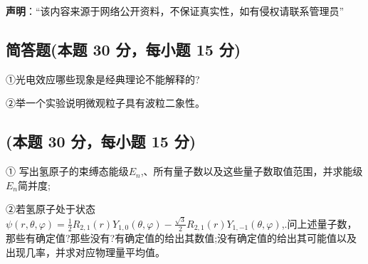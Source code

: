 
\textbf{声明}：“该内容来源于网络公开资料，不保证真实性，如有侵权请联系管理员”

\subsection{简答题(本题 30 分，每小题 15 分)}
①光电效应哪些现象是经典理论不能解释的?

②举一个实验说明微观粒子具有波粒二象性。

\subsection{(本题 30 分，每小题 15 分)}
① 写出氢原子的束缚态能级$E_n$,、所有量子数以及这些量子数取值范围，并求能级$E_n$简并度;

②若氢原子处于状态$\psi(r, \theta, \varphi) = \frac{1}{2} R_{2,1}(r) Y_{1,0}(\theta, \varphi) - \frac{\sqrt{3}}{2} R_{2,1}(r) Y_{1,-1}(\theta, \varphi)$,.问上述量子数，那些有确定值?那些没有?有确定值的给出其数值;没有确定值的给出其可能值以及出现几率，并求对应物理量平均值。